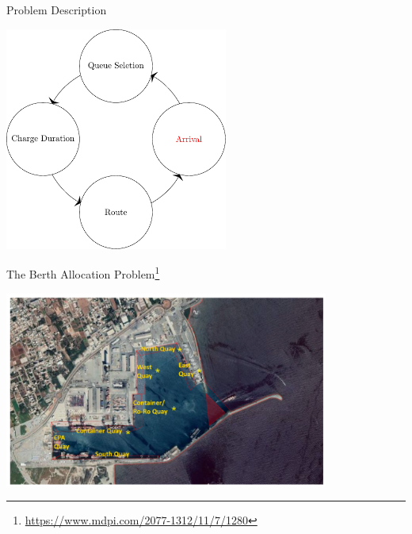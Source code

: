 \documentclass[aspectratio=169]{beamer}
\begin{document}
\begin{frame}[label={sec:org346e7a3}]{Problem Description}
\begin{center}
\includegraphics[width=0.55\textwidth]{./img/visit.pdf}
\end{center}
\end{frame}

\begin{frame}[label={sec:org633a68c}]{The Berth Allocation Problem\footnote{\url{https://www.mdpi.com/2077-1312/11/7/1280}}}
\begin{center}
\includegraphics[width=0.8\textwidth]{./img/berthing-sky-picture.png}
\end{center}
\end{frame}
\end{document}
